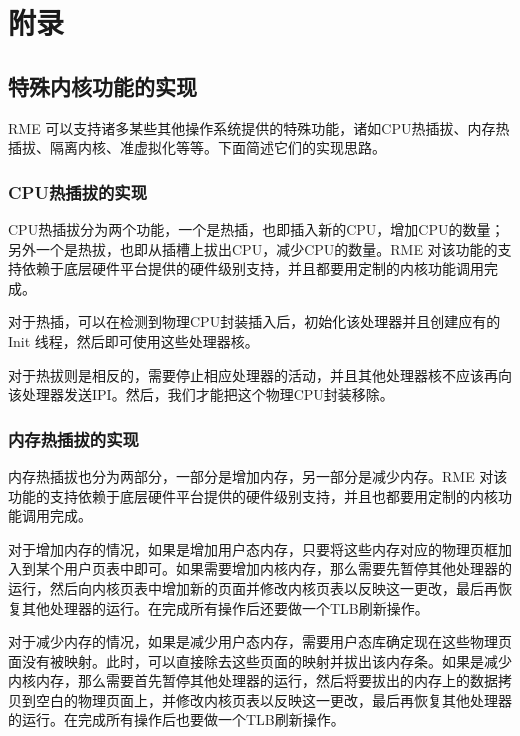 \chapter{附录}\label{ch:appendix}

\section{特殊内核功能的实现}\label{sec:9-special-kernel-features}

RME 可以支持诸多某些其他操作系统提供的特殊功能，诸如CPU热插拔、内存热插拔、隔离内核、准虚拟化等等。下面简述它们的实现思路。

\subsection{CPU热插拔的实现}\label{subsec:9-cpu-hotplug}

CPU热插拔分为两个功能，一个是热插，也即插入新的CPU，增加CPU的数量；另外一个是热拔，也即从插槽上拔出CPU，减少CPU的数量。RME 对该功能的支持依赖于底层硬件平台提供的硬件级别支持，并且都要用定制的内核功能调用完成。

对于热插，可以在检测到物理CPU封装插入后，初始化该处理器并且创建应有的 Init 线程，然后即可使用这些处理器核。

对于热拔则是相反的，需要停止相应处理器的活动，并且其他处理器核不应该再向该处理器发送IPI。然后，我们才能把这个物理CPU封装移除。

\subsection{内存热插拔的实现}\label{subsec:9-memory-hotplug}

内存热插拔也分为两部分，一部分是增加内存，另一部分是减少内存。RME 对该功能的支持依赖于底层硬件平台提供的硬件级别支持，并且也都要用定制的内核功能调用完成。

对于增加内存的情况，如果是增加用户态内存，只要将这些内存对应的物理页框加入到某个用户页表中即可。如果需要增加内核内存，那么需要先暂停其他处理器的运行，然后向内核页表中增加新的页面并修改内核页表以反映这一更改，最后再恢复其他处理器的运行。在完成所有操作后还要做一个TLB刷新操作。

对于减少内存的情况，如果是减少用户态内存，需要用户态库确定现在这些物理页面没有被映射。此时，可以直接除去这些页面的映射并拔出该内存条。如果是减少内核内存，那么需要首先暂停其他处理器的运行，然后将要拔出的内存上的数据拷贝到空白的物理页面上，并修改内核页表以反映这一更改，最后再恢复其他处理器的运行。在完成所有操作后也要做一个TLB刷新操作。

